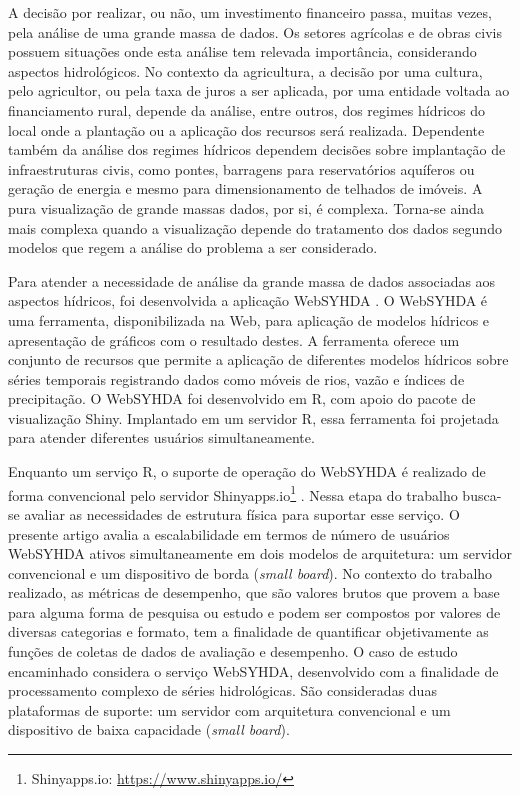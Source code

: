 \documentclass[12pt,english,brazil]{article}
\begin{document}
A decisão por realizar, ou não, um investimento financeiro passa, muitas vezes, pela análise de uma grande
massa de dados. Os setores agrícolas e de obras civis possuem situações onde esta análise tem relevada importância, considerando aspectos hidrológicos. No contexto da agricultura, a decisão
por uma cultura, pelo agricultor, ou pela taxa de juros a ser aplicada, por uma entidade voltada ao
financiamento rural, depende da análise, entre outros, dos regimes hídricos do local onde a plantação ou
a aplicação dos recursos será realizada. Dependente também da análise dos regimes hídricos dependem
decisões sobre implantação de infraestruturas civis, como pontes, barragens para reservatórios aquíferos
ou geração de energia e mesmo para dimensionamento de telhados de imóveis. A pura visualização de
grande massas dados, por si, é complexa. Torna-se ainda mais complexa quando a visualização depende
do tratamento dos dados segundo modelos que regem a análise do problema a ser considerado.

Para atender a necessidade de análise da grande massa de dados associadas aos aspectos hídricos, foi desenvolvida a aplicação WebSYHDA \cite{syhda}. O WebSYHDA é uma ferramenta, disponibilizada na Web, para aplicação de modelos hídricos e apresentação de gráficos com o resultado destes. A
ferramenta oferece um conjunto de recursos que permite a aplicação de diferentes modelos hídricos sobre
séries temporais registrando dados como móveis de rios, vazão e índices de precipitação. O WebSYHDA
foi desenvolvido em R, com apoio do pacote de visualização Shiny. Implantado em um servidor R, essa
ferramenta foi projetada para atender diferentes usuários simultaneamente.

Enquanto um serviço R, o suporte de operação do WebSYHDA é realizado de forma convencional pelo servidor Shinyapps.io\footnote{Shinyapps.io: \url{https://www.shinyapps.io/}} . Nessa etapa do trabalho busca-se avaliar as necessidades de
estrutura física para suportar esse serviço. O presente artigo avalia a escalabilidade em termos de número
de usuários WebSYHDA ativos simultaneamente em dois modelos de arquitetura: um servidor convencional
e um dispositivo de borda (\emph{small board}). No contexto do trabalho realizado, as métricas de desempenho, que são valores brutos que provem a base para alguma forma de pesquisa ou estudo e podem ser compostos por valores de diversas categorias e formato, tem a finalidade de quantificar objetivamente as funções de coletas de dados de avaliação e desempenho.
O caso de estudo encaminhado considera o serviço WebSYHDA, desenvolvido com a finalidade de processamento complexo de séries hidrológicas. São consideradas duas plataformas de suporte: um servidor com arquitetura convencional e um dispositivo de baixa capacidade (\emph{small board}). 
\end{document}
